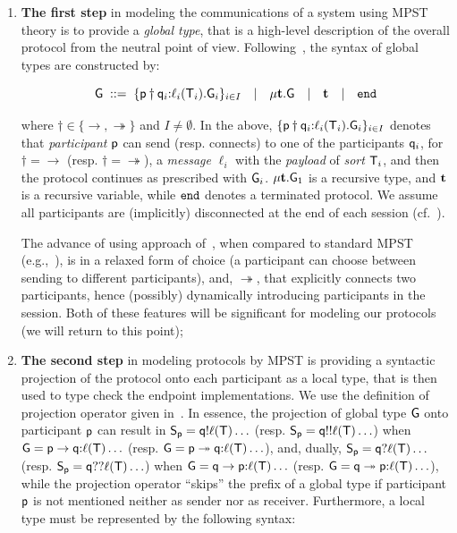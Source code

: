 \begin{enumerate}[start=1,label={(\bfseries \arabic*)}]
	\item \textbf{The first step} in modeling the communications of a system using MPST theory is to provide a \emph{global type}, that is a high-level description of the overall protocol from the neutral point of view. Following~\cite{HuY17}, the syntax of global types are constructed by:
	
	\begin{equation}
	{\sf G} \; ::= \;
	\{{\sf p}\dagger{\sf q}_i{:}\ell_i({\mathsf T}_i).{\sf G}_i\}_{i\in I}  \quad | \quad 
	\mu \textbf{t}.{\sf G} \quad | \quad 
	\textbf{t} \quad | \quad
	\mathtt{end}
	\end{equation}
	
	\noindent
	where $\dagger\in\{\to, \twoheadrightarrow\}$ and $I\not=\emptyset$. 
	In the above, $\{{\sf p}\dagger{\sf q}_i{:}\ell_i({\mathsf T}_i).{\sf G}_i\}_{i\in I}$
	denotes that \emph{participant} ${\sf p}$ can send (resp. connects) to one of the participants ${\sf q}_i$, 
	for $\dagger=\to$ (resp. $\dagger=\twoheadrightarrow$), 
	a \emph{message} $\ell_i$ with the \emph{payload} of \emph{sort} ${\mathsf T}_i$, 
	and then the protocol continues as prescribed with ${\sf G}_i$.  
	$\mu \textbf{t}.{\sf G}_1$ is a recursive type, and $\textbf{t}$ is a recursive variable, 
	while $\mathtt{end}$ denotes a terminated protocol. We assume all participants are (implicitly) disconnected at the end of each session (cf.~\cite{HuY17}).
	
	The advance of using approach of~\cite{HuY17}, when compared to standard MPST (e.g.,~\cite{HondaYC08}),
	is in a relaxed form of choice (a participant can choose between sending to different participants), 
	and, $\twoheadrightarrow$, that explicitly connects two participants, hence (possibly) dynamically 
	introducing participants in the session.
	Both of these features will be significant for modeling our protocols (we will return to this point);
	
	\item \textbf{The second step} in modeling protocols by MPST is providing a syntactic projection of the protocol onto each participant as a local type, that is then used to
	type check the endpoint implementations.  
	We use the definition of projection operator given in~\cite[Figure \ref{fig:fig2}]{HuY17}. 
	In essence, the projection of global type ${\sf G}$ onto participant ${\sf p}$ can result in 
	${\mathsf S}_{\sf p}={\sf q}{!}\ell({\mathsf T})\ldots$ (resp. ${\mathsf S}_{\sf p}={\sf q}{!!}\ell({\mathsf T})\ldots$) 
	when ${\sf G}={\sf p}\to{\sf q}{:}\ell({\mathsf T})\ldots$ (resp. ${\sf G}={\sf p}\twoheadrightarrow{\sf q}{:}\ell({\mathsf T})\ldots$), 
	and, dually, ${\mathsf S}_{\sf p}={\sf q}{?}\ell({\mathsf T})\ldots$ (resp. ${\mathsf S}_{\sf p}={\sf q}{??}\ell({\mathsf T})\ldots$) when ${\sf G}={\sf q}\to{\sf p}{:}\ell({\mathsf T})\ldots$ 
	(resp. ${\sf G}={\sf q}\twoheadrightarrow{\sf p}{:}\ell({\mathsf T})\ldots$), 
	while the projection operator ``skips'' the prefix of a global type if participant ${\sf p}$ is not mentioned neither as sender nor as receiver. Furthermore, a local type must be represented by the following syntax:
	

\end{enumerate}
